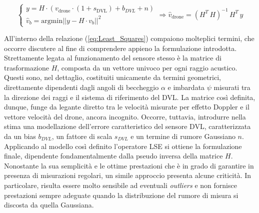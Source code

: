     \vspace{-8pt}

    \begin{equation}
        \begin{cases}
            y = H \cdot (v_{\text{drone}} \cdot (1 + s_{\text{DVL}}) + b_{DVL} + n) \\[0.30cm]
            \hat{v}_{b} = \text{argmin} ||y - H \cdot v_{b} ||^{2}
        \end{cases} \Longrightarrow \hat{v}_{\text{drone}} = \left(H^{T} \, H\right)^{-1} \, H^{T} \, y
        \label{eq:Least_Squares}
    \end{equation}

All'interno della relazione (\ref{eq:Least_Squares}) compaiono molteplici termini, che occorre discutere al fine di comprendere appieno la formulazione introdotta. Strettamente legata al funzionamento del sensore stesso è la matrice di trasformazione $H$, composta da un vettore univoco per ogni raggio acustico. Questi sono, nel dettaglio, costituiti unicamente da termini geometrici, direttamente dipendenti dagli angoli di beccheggio $\alpha$ e imbardata $\psi$ misurati tra la direzione dei raggi e il sistema di riferimento del DVL. La matrice così definita, dunque, funge da legante diretto tra le velocità misurate per effetto Doppler e il vettore velocità del drone, ancora incognito. Occorre, tuttavia, introdurre nella stima una modellazione dell'errore caratteristico del sensore DVL, caratterizzata da un bias $b_{DVL}$, un fattore di scala $s_{DVL}$ e un termine di rumore Gaussiano $n$. Applicando al modello così definito l'operatore LSE si ottiene la formulazione finale, dipendente fondamentalmente dalla pseudo inversa della matrice $H$. Nonostante la sua semplicità e le ottime prestazioni che è in grado di garantire in presenza di misurazioni regolari, un simile approccio presenta alcune criticità. In particolare, risulta essere molto sensibile ad eventuali \emph{outliers} e non fornisce prestazioni sempre adeguate quando la distribuzione del rumore di misura si discosta da quella Gaussiana.


